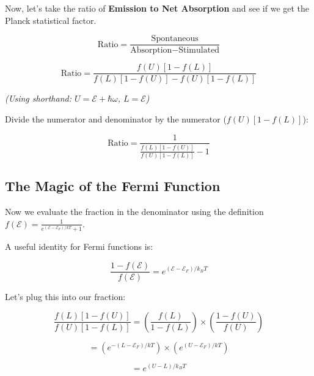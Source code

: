 Now, let's take the ratio of \textbf{Emission to Net Absorption} and see if we get the Planck statistical factor.

\begin{equation}
\text{Ratio} = \frac{\text{Spontaneous}}{\text{Absorption} - \text{Stimulated}}
\label{eq:kirchhoff_ratio}
\end{equation}

\begin{equation}
\text{Ratio} = \frac{f(U)[1-f(L)]}{f(L)[1-f(U)] - f(U)[1-f(L)]}
\label{eq:kirchhoff_ratio_expanded}
\end{equation}

\textit{(Using shorthand: $U = \mathcal{E}+\hbar\omega$, $L = \mathcal{E}$)}

Divide the numerator and denominator by the numerator ($f(U)[1-f(L)]$):

\begin{equation}
\text{Ratio} = \frac{1}{ \frac{f(L)[1-f(U)]}{f(U)[1-f(L)]} - 1 }
\label{eq:kirchhoff_ratio_divided}
\end{equation}

\subsection{The Magic of the Fermi Function}

Now we evaluate the fraction in the denominator using the definition $f(\mathcal{E}) = \frac{1}{e^{(\mathcal{E}-\mathcal{E}_F)/kT} + 1}$.

A useful identity for Fermi functions is:

\begin{equation}
\frac{1-f(\mathcal{E})}{f(\mathcal{E})} = e^{(\mathcal{E}-\mathcal{E}_F)/k_B T}
\label{eq:kirchhoff_fermi_identity}
\end{equation}

Let's plug this into our fraction:

\begin{equation}
\frac{f(L)[1-f(U)]}{f(U)[1-f(L)]} = \left( \frac{f(L)}{1-f(L)} \right) \times \left( \frac{1-f(U)}{f(U)} \right)
\label{eq:kirchhoff_fraction}
\end{equation}

\begin{equation}
= \left( e^{-(L-\mathcal{E}_F)/kT} \right) \times \left( e^{(U-\mathcal{E}_F)/kT} \right)
\label{eq:kirchhoff_fraction_simplified}
\end{equation}

\begin{equation}
= e^{(U - L)/k_B T}
\label{eq:kirchhoff_fraction_final}
\end{equation}

